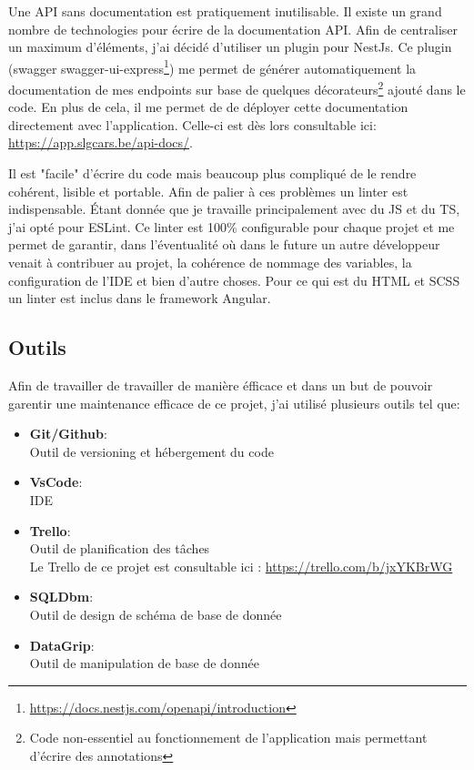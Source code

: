\newpara

Une API sans documentation est pratiquement inutilisable. Il existe un grand nombre de technologies pour écrire de la documentation API. Afin de centraliser un maximum d'éléments, j'ai décidé d'utiliser un plugin pour NestJs. Ce plugin (swagger swagger-ui-express\footnote{\url{https://docs.nestjs.com/openapi/introduction}}) me permet de générer automatiquement la documentation de mes endpoints sur base de quelques décorateurs\footnote{Code non-essentiel au fonctionnement de l'application mais permettant d'écrire des annotations} ajouté dans le code. En plus de cela, il me permet de de déployer cette documentation directement avec l'application. Celle-ci est dès lors consultable ici:\\\url{https://app.slgcars.be/api-docs/}.

\newpage


Il est "facile" d'écrire du code mais beaucoup plus compliqué de le rendre cohérent, lisible et portable. Afin de palier à ces problèmes un linter est indispensable. Étant donnée que je travaille principalement avec du JS et du TS, j'ai opté pour ESLint. Ce linter est 100\% configurable pour chaque projet et me permet de garantir, dans l'éventualité où dans le future un autre développeur venait à contribuer au projet, la cohérence de nommage des variables, la configuration de l'IDE et bien d'autre choses. Pour ce qui est du HTML et SCSS un linter est inclus dans le framework Angular.

\subsection{Outils}

Afin de travailler de travailler de manière éfficace et dans un but de pouvoir garentir une maintenance efficace de ce projet, j'ai utilisé plusieurs outils tel que:

\newpara

\begin{itemize}
  \item \textbf{Git/Github}: \\ Outil de versioning et hébergement du code 
  \item \textbf{VsCode}: \\ IDE 
  \item \textbf{Trello}: \\ Outil de planification des tâches \\ Le Trello de ce projet est consultable ici : \url{https://trello.com/b/jxYKBrWG}
  \item \textbf{SQLDbm}: \\ Outil de design de schéma de base de donnée
  \item \textbf{DataGrip}: \\ Outil de manipulation de base de donnée
\end{itemize}
